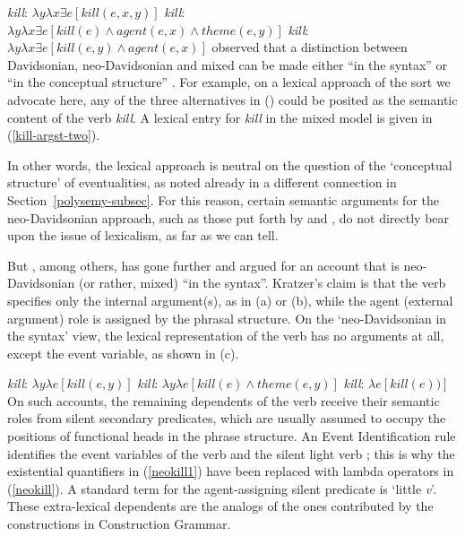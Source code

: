 \eal\settowidth{} \label{neokill1}
\ex \emph{kill}: $\lambda y\lambda x\exists e[kill(e, x, y)]$  
\ex \emph{kill}: $\lambda y\lambda x\exists e[kill(e) \wedge agent(e, x) \wedge theme(e, y)]$ 
\ex \emph{kill}: $\lambda y\lambda x\exists e[kill(e,y) \wedge agent(e, x)]$ 
\zl
\citet{Kratzer96a} observed that a distinction between Davidsonian, neo-Davidsonian and mixed can be
made either ``in the syntax'' or ``in the conceptual structure'' \citep[--111]{Kratzer96a}.  For
example, on a lexical approach of the sort we advocate here, any of the three alternatives in
() could be posited as the semantic content of the verb \emph{kill}.  A lexical entry for
\emph{kill} in the mixed model is given in (\ref{kill-argst-two}). 

\ea\label{kill-argst-two}
\z
In other words, the lexical approach is neutral on the question of the `conceptual structure' of eventualities, as noted already in a different connection in 
Section~\ref{polysemy-subsec}.  For this reason, certain semantic arguments for the neo-Davidsonian approach, such as those put forth by  \citet[Chapter~4]{Schein93a-u} 
and \citet{Lohndal2012a}, do not directly bear upon the issue of lexicalism, as far as we can tell.  

But \citet{Kratzer96a}, among others, has gone further and argued for an account that is neo-Davidsonian (or rather, mixed) ``in the syntax''.  
Kratzer's claim is that the verb specifies only the internal argument(s), as in (a) or (b), while the agent (external argument) role is assigned by the phrasal structure.  
On the `neo-Davidsonian in the syntax' view, the lexical representation of the verb has no arguments at all, except the event variable, as shown in (c).

\eal
\label{neokill}\settowidth{}
\ex \emph{kill}: $\lambda y\lambda e[kill(e, y)]$                         
\ex \emph{kill}: $\lambda y\lambda e[kill(e) \wedge theme(e, y)]$ 
\ex \emph{kill}: $\lambda e[kill(e))]$                                  
\zl
On such accounts, the remaining dependents of the verb receive their semantic roles from silent secondary predicates,
which are usually assumed to occupy the positions of functional heads in the phrase structure.  An
Event Identification rule identifies the event variables of the verb and the silent light verb
\citep[]{Kratzer96a}; this is why the existential quantifiers in (\ref{neokill1}) have been
replaced with lambda operators in  (\ref{neokill}).  A standard term for the agent-assigning silent
predicate is `little \emph{v}'.  These extra-lexical dependents are the analogs of the ones
contributed by the constructions in Construction Grammar.   

